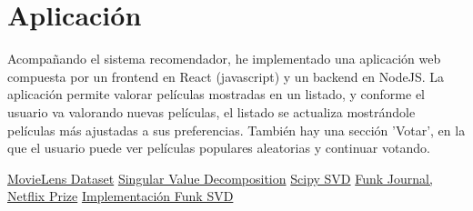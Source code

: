 \documentclass[a4paper, 11pt]{article}
\begin{document}
	\section{Aplicación}
  	 	\noindent Acompañando el sistema recomendador, he implementado una aplicación web compuesta por un frontend en React (javascript) y un backend en NodeJS. 
  	 	\noindent La aplicación permite valorar películas mostradas en un listado, y conforme el usuario va valorando nuevas películas, el listado se actualiza mostrándole películas más ajustadas a sus preferencias. También hay una sección 'Votar', en la que el usuario puede ver películas populares aleatorias y continuar votando.
 	
\begin{thebibliography}{50}
	
	\href{https://grouplens.org/datasets/movielens/ }{MovieLens Dataset}
	\href{https://en.wikipedia.org/wiki/Singular-value_decomposition}{Singular Value Decomposition}
	\href{https://docs.scipy.org/doc/scipy/reference/generated/scipy.linalg.svd.html}{Scipy SVD}
	\href{http://sifter.org/simon/journal/20061211.html}{Funk Journal, Netflix Prize}
	\href{https://github.com/pancho111203/movielens-recommender-svd/blob/master/ai/svd_recommender.py}{Implementación Funk SVD}
\end{thebibliography}
\end{document}
